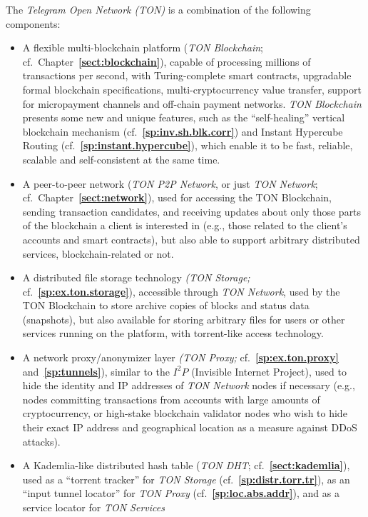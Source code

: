 \documentclass[12pt,oneside]{article}
\def\refpoint#1{{\rm\textbf{\ref{#1}}}}
\let\ptref=\refpoint
\begin{document}
The {\em Telegram Open Network (TON)} is a combination of the
following components:
\begin{itemize}
\item A flexible multi-blockchain platform ({\em TON Blockchain};
  cf.\ Chapter~\ptref{sect:blockchain}), capable of processing
  millions of transactions per second, with Turing-complete smart
  contracts, upgradable formal blockchain specifications,
  multi-cryptocurrency value transfer, support for micropayment
  channels and off-chain payment networks. {\em TON Blockchain\/}
  presents some new and unique features, such as the ``self-healing''
  vertical block\-chain mechanism (cf.~\ptref{sp:inv.sh.blk.corr}) and
  Instant Hypercube Routing (cf.~\ptref{sp:instant.hypercube}), which
  enable it to be fast, reliable, scalable and self-consistent at the
  same time.
\item A peer-to-peer network ({\em TON P2P Network}, or just {\em TON
  Network}; cf.\ Chapter~\ptref{sect:network}), used for accessing the
  TON Block\-chain, sending transaction candidates, and receiving
  updates about only those parts of the blockchain a client is
  interested in (e.g., those related to the client's accounts and
  smart contracts), but also able to support arbitrary distributed
  services, blockchain-related or not.
\item A distributed file storage technology {\em (TON Storage;}
  cf.~\ptref{sp:ex.ton.storage}), accessible through {\em TON
    Network}, used by the TON Blockchain to store archive copies of
  blocks and status data (snapshots), but also available for storing
  arbitrary files for users or other services running on the platform,
  with torrent-like access technology.
\item A network proxy/anonymizer layer {\em (TON Proxy;}
  cf.~\ptref{sp:ex.ton.proxy} and~\ptref{sp:tunnels}), similar to the
  $I^2P$ (Invisible Internet Project), used to hide the identity and
  IP addresses of {\em TON Network\/} nodes if necessary (e.g., nodes
  committing transactions from accounts with large amounts of
  cryptocurrency, or high-stake blockchain validator nodes who wish to
  hide their exact IP address and geographical location as a measure
  against DDoS attacks).
\item A Kademlia-like distributed hash table ({\em TON DHT};
  cf.~\ptref{sect:kademlia}), used as a ``torrent tracker'' for {\em
    TON Storage} (cf.~\ptref{sp:distr.torr.tr}), as an ``input tunnel
  locator'' for {\em TON Proxy\/} (cf.~\ptref{sp:loc.abs.addr}), and
  as a service locator for {\em TON Services}

\end{itemize}
\end{document}
